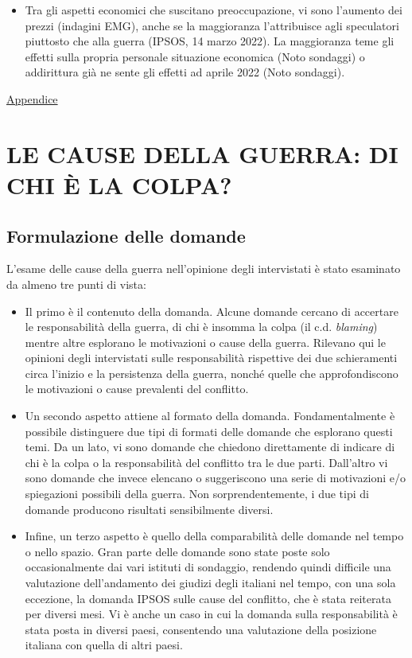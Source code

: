 \documentclass[
]{book}
\providecommand{\tightlist}{%
  \setlength{\itemsep}{0pt}\setlength{\parskip}{0pt}}
\begin{document}
\begin{itemize}
\tightlist
\item
  Tra gli aspetti economici che suscitano preoccupazione, vi sono l'aumento dei prezzi (indagini EMG), anche se la maggioranza l'attribuisce agli speculatori piuttosto che alla guerra (IPSOS, 14 marzo 2022). La maggioranza teme gli effetti sulla propria personale situazione economica (Noto sondaggi) o addirittura già ne sente gli effetti ad aprile 2022 (Noto sondaggi).
\end{itemize}

\href{https://github.com/LucianaFazio/Ucrania/blob/main/PDF_Appendice/II\%20Preoccupazioni\%20Ucraina\%20v.6.pdf}{Appendice}

\hypertarget{le-cause-della-guerra-di-chi-uxe8-la-colpa}{%
\chapter{LE CAUSE DELLA GUERRA: DI CHI È LA COLPA?}\label{le-cause-della-guerra-di-chi-uxe8-la-colpa}}

\hypertarget{formulazione-delle-domande-1}{%
\section{Formulazione delle domande}\label{formulazione-delle-domande-1}}

L'esame delle cause della guerra nell'opinione degli intervistati è stato esaminato da almeno tre punti di vista:

\begin{itemize}
\item
  Il primo è il contenuto della domanda. Alcune domande cercano di accertare le responsabilità della guerra, di chi è insomma la colpa (il c.d. \emph{blaming}) mentre altre esplorano le motivazioni o cause della guerra. Rilevano qui le opinioni degli intervistati sulle responsabilità rispettive dei due schieramenti circa l'inizio e la persistenza della guerra, nonché quelle che approfondiscono le motivazioni o cause prevalenti del conflitto.
\item
  Un secondo aspetto attiene al formato della domanda. Fondamentalmente è possibile distinguere due tipi di formati delle domande che esplorano questi temi. Da un lato, vi sono domande che chiedono direttamente di indicare di chi è la colpa o la responsabilità del conflitto tra le due parti. Dall'altro vi sono domande che invece elencano o suggeriscono una serie di motivazioni e/o spiegazioni possibili della guerra. Non sorprendentemente, i due tipi di domande producono risultati sensibilmente diversi.
\item
  Infine, un terzo aspetto è quello della comparabilità delle domande nel tempo o nello spazio. Gran parte delle domande sono state poste solo occasionalmente dai vari istituti di sondaggio, rendendo quindi difficile una valutazione dell'andamento dei giudizi degli italiani nel tempo, con una sola eccezione, la domanda IPSOS sulle cause del conflitto, che è stata reiterata per diversi mesi. Vi è anche un caso in cui la domanda sulla responsabilità è stata posta in diversi paesi, consentendo una valutazione della posizione italiana con quella di altri paesi.
\end{itemize}
\end{document}
